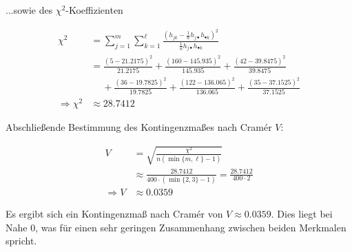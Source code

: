 ...sowie des $\chi^2$-Koeffizienten

$$
\begin{aligned}
    \chi^2 &= \sum_{j=1}^m \sum_{k=1}^\ell \frac{(h_{jk} - \frac1n h_{j\bullet} h_{\bullet k})^2}{\frac1n h_{j\bullet} h_{\bullet k}} \\
    &= \frac{(5-21.2175)^2}{21.2175} + \frac{(160-145.935)^2}{145.935} + \frac{(42-39.8475)^2}{39.8475} \\
    & \quad~ + \frac{(36-19.7825)^2}{19.7825} + \frac{(122-136.065)^2}{136.065} + \frac{(35-37.1525)^2}{37.1525} \\
    \Rightarrow \chi^2 &\approx 28.7412
\end{aligned}
$$

Abschließende Bestimmung des Kontingenzmaßes nach Cramér $V$:

$$
\begin{aligned}
    V &= \sqrt{\frac{\chi^2}{n (\min\lbrace m,\ell \rbrace - 1)}} \\
    &\approx \frac{28.7412}{400 \cdot (\min\lbrace2,3\rbrace - 1)} = \frac{28.7412}{400 \cdot 2} \\
    \Rightarrow V &\approx 0.0359
\end{aligned}
$$

Es ergibt sich ein Kontingenzmaß nach Cramér von $V\approx0.0359$. Dies liegt bei Nahe 0, was für einen sehr geringen Zusammenhang zwischen beiden Merkmalen spricht.
